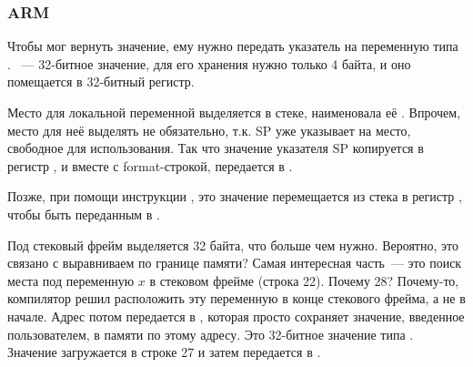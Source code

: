 \subsubsection{ARM}

\myparagraph{\OptimizingKeilVI (\ThumbMode)}



\myindex{\CLanguageElements!\Pointers}
Чтобы \scanf мог вернуть значение, ему нужно передать указатель на переменную типа \Tint.
\Tint~--- 32-битное значение, для его хранения нужно только 4 байта, и оно помещается в 32-битный регистр.

Место для локальной переменной  выделяется в стеке, \IDA наименовала её . 
Впрочем, место для неё выделять не обязательно, т.к.  \ac{SP} уже указывает на место, 
свободное для использования.
Так что значение указателя \ac{SP} копируется в регистр , и вместе с format-строкой, 
передается в \scanf.

Позже, при помощи инструкции , это значение перемещается из стека в регистр , чтобы быть переданным в \printf.




Под стековый фрейм выделяется 32 байта, что больше чем нужно. Вероятно, это связано с выравниваем по границе памяти?
Самая интересная часть~--- это поиск места под переменную $x$ в стековом фрейме (строка 22).
Почему 28? Почему-то, компилятор решил расположить эту переменную в конце стекового фрейма, а не в начале.
Адрес потом передается в \scanf, которая просто сохраняет значение, введенное пользователем, в памяти по этому адресу.
Это 32-битное значение типа \Tint.
Значение загружается в строке 27 и затем передается в \printf.

